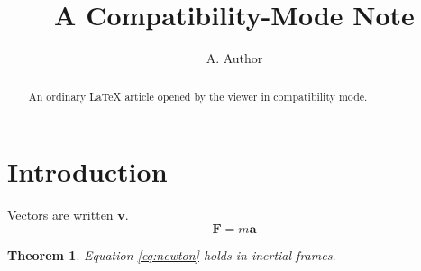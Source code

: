 \documentclass[11pt,a4paper]{article}
\title{A Compatibility-Mode Note}
\author{A. Author}
\newtheorem{theorem}{Theorem}
\def\vect{\mathbf}
\begin{document}
\maketitle
\begin{abstract}
An ordinary LaTeX article opened by the viewer in compatibility mode.
\end{abstract}

\section{Introduction}\label{sec:intro}
Vectors are written $\vect{v}$.
\begin{equation}\label{eq:newton}
  \vect{F} = m \vect{a}
\end{equation}
\begin{theorem}\label{thm:one}
Equation \eqref{eq:newton} holds in inertial frames.
\end{theorem}



\newpage


\end{document}
